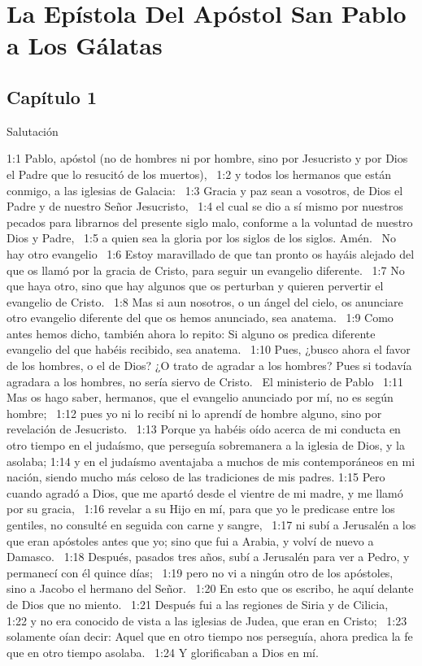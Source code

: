 \chapter{La Epístola Del Apóstol San Pablo a Los  Gálatas}


\section*{Capítulo 1}
Salutación  

1:1 Pablo, apóstol (no de hombres ni por hombre, sino por Jesucristo y por Dios el Padre que lo resucitó de los muertos),  
1:2 y todos los hermanos que están conmigo, a las iglesias de Galacia:  
1:3 Gracia y paz sean a vosotros, de Dios el Padre y de nuestro Señor Jesucristo,  
1:4 el cual se dio a sí mismo por nuestros pecados para librarnos del presente siglo malo, conforme a la voluntad de nuestro Dios y Padre,  
1:5 a quien sea la gloria por los siglos de los siglos. Amén.  
No hay otro evangelio  
1:6 Estoy maravillado de que tan pronto os hayáis alejado del que os llamó por la gracia de Cristo, para seguir un evangelio diferente.  
1:7 No que haya otro, sino que hay algunos que os perturban y quieren pervertir el evangelio de Cristo.  
1:8 Mas si aun nosotros, o un ángel del cielo, os anunciare otro evangelio diferente del que os hemos anunciado, sea anatema.  
1:9 Como antes hemos dicho, también ahora lo repito: Si alguno os predica diferente evangelio del que habéis recibido, sea anatema.  
1:10 Pues, ¿busco ahora el favor de los hombres, o el de Dios? ¿O trato de agradar a los hombres? Pues si todavía agradara a los hombres, no sería siervo de Cristo.  
El ministerio de Pablo  
1:11 Mas os hago saber, hermanos, que el evangelio anunciado por mí, no es según hombre;  
1:12 pues yo ni lo recibí ni lo aprendí de hombre alguno, sino por revelación de Jesucristo.  
1:13 Porque ya habéis oído acerca de mi conducta en otro tiempo en el judaísmo, que perseguía sobremanera a la iglesia de Dios, y la asolaba; 
1:14 y en el judaísmo aventajaba a muchos de mis contemporáneos en mi nación, siendo mucho más celoso de las tradiciones de mis padres. 
1:15 Pero cuando agradó a Dios, que me apartó desde el vientre de mi madre, y me llamó por su gracia,  
1:16 revelar a su Hijo en mí, para que yo le predicase entre los gentiles, no consulté en seguida con carne y sangre,  
1:17 ni subí a Jerusalén a los que eran apóstoles antes que yo; sino que fui a Arabia, y volví de nuevo a Damasco.  
1:18 Después, pasados tres años, subí a Jerusalén para ver a Pedro, y permanecí con él quince días;  
1:19 pero no vi a ningún otro de los apóstoles, sino a Jacobo el hermano del Señor.  
1:20 En esto que os escribo, he aquí delante de Dios que no miento.  
1:21 Después fui a las regiones de Siria y de Cilicia,  
1:22 y no era conocido de vista a las iglesias de Judea, que eran en Cristo;  
1:23 solamente oían decir: Aquel que en otro tiempo nos perseguía, ahora predica la fe que en otro tiempo asolaba.  
1:24 Y glorificaban a Dios en mí. 

